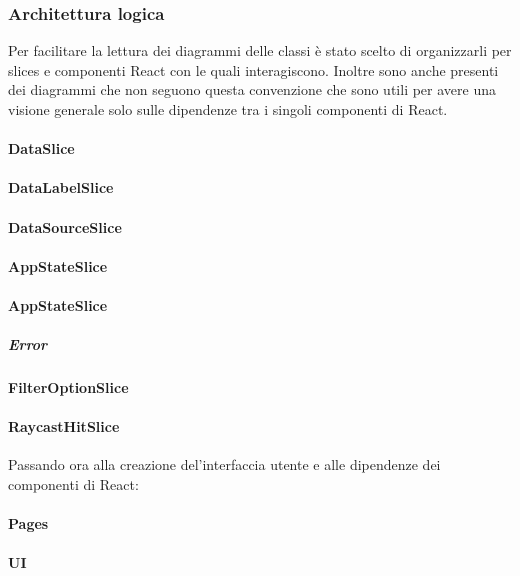 \newpage

\subsubsection{Architettura logica}
Per facilitare la lettura dei diagrammi delle classi è stato scelto di organizzarli per slices e componenti React con le quali interagiscono.
Inoltre sono anche presenti dei diagrammi che non seguono questa convenzione che sono utili per avere una visione
generale solo sulle dipendenze tra i singoli componenti di React.

\paragraph{DataSlice}

\paragraph{DataLabelSlice}

\paragraph{DataSourceSlice}

\paragraph{AppStateSlice}

\paragraph{AppStateSlice}
\subparagraph{Error}

\paragraph{FilterOptionSlice}

\paragraph{RaycastHitSlice}

Passando ora alla creazione del'interfaccia utente e alle dipendenze dei componenti di React:

\paragraph{Pages}

\paragraph{UI}


